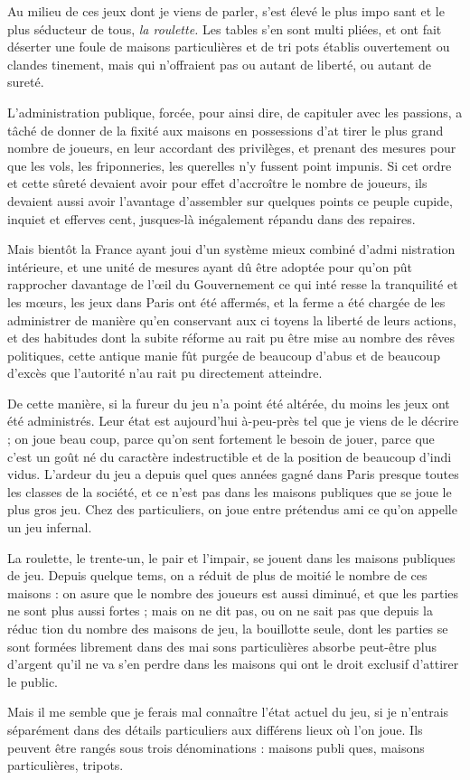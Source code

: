 Au milieu de ces jeux dont je viens
de parler, s'est élevé le plus impo%
sant et le plus séducteur de tous, \emph{la
roulette.} Les tables s'en sont multi%
pliées, et ont fait déserter une foule
de maisons particulières et de tri%
pots établis ouvertement ou clandes%
tinement, mais qui n'offraient pas
ou autant de liberté, ou autant de
sureté.

L'administration publique, forcée,
pour ainsi dire, de capituler avec les
passions, a tâché de donner de la
fixité aux maisons en possessions d'at%
tirer le plus grand nombre de joueurs,
en leur accordant des privilèges, et
prenant des mesures pour que les
vols, les friponneries, les querelles n'y
fussent point impunis. Si cet ordre et
cette sûreté devaient avoir pour effet
d'accroître le nombre de joueurs,
ils devaient aussi avoir l'avantage
d'assembler sur quelques points ce
peuple cupide, inquiet et efferves%
cent, jusques-là inégalement répandu
dans des repaires.

Mais bientôt la France ayant joui
d'un système mieux combiné d'admi%
nistration intérieure, et une unité de
mesures ayant dû être adoptée pour
qu'on pût rapprocher davantage de
l'œil du Gouvernement ce qui inté%
resse la tranquilité et les mœurs, les
jeux dans Paris ont été affermés, et la
ferme a été chargée de les administrer
de manière qu'en conservant aux ci%
toyens la liberté de leurs actions, et des
habitudes dont la subite réforme au%
rait pu être mise au nombre des rêves
politiques, cette antique manie fût
purgée de beaucoup d'abus et de 
beaucoup d'excès que l'autorité n'au%
rait pu directement atteindre.

De cette manière, si la fureur du
jeu n'a point été altérée, du moins les
jeux ont été administrés. Leur état
est aujourd'hui à-peu-près tel que je
viens de le décrire \notemark ; on joue beau%
coup, parce qu'on sent fortement le
besoin de jouer, parce que c'est un
goût né du caractère indestructible
et de la position de beaucoup d'indi%
vidus. L'ardeur du jeu a depuis quel%
ques années gagné dans Paris presque
toutes les classes de la société, et ce
n'est pas dans les maisons publiques
que se joue le plus gros jeu. Chez des
particuliers, on joue entre prétendus
ami ce qu'on appelle un jeu infernal.

La roulette, le trente-un, le pair et
l'impair, se jouent dans les maisons
publiques de jeu. Depuis quelque
tems, on a réduit de plus de moitié
le nombre de ces maisons : on asure 
que le nombre des joueurs est aussi
diminué, et que les parties ne sont
plus aussi fortes ; mais on ne dit pas,
ou on ne sait pas que depuis la réduc%
tion du nombre des maisons de jeu,
la bouillotte seule, dont les parties se
sont formées librement dans des mai%
sons particulières  absorbe peut-être plus
d'argent qu'il ne va s'en perdre dans
les maisons qui ont le droit exclusif
d'attirer le public.

Mais il me semble que je ferais mal
connaître l'état actuel du jeu, si je
n'entrais séparément dans des détails
particuliers aux différens lieux où
l'on joue. Ils peuvent être rangés sous
trois dénominations : maisons publi%
ques, maisons particulières, tripots.
